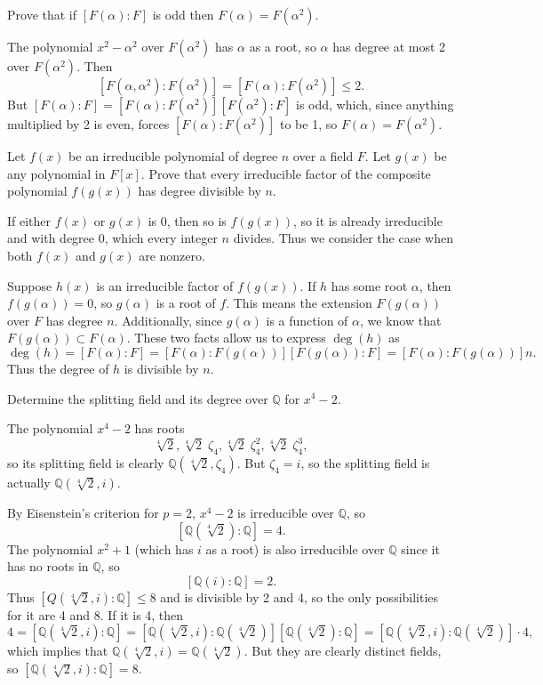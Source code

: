 \documentclass[10pt]{report}
\begin{document}
\begin{exer}[DF 13.2: 14]
	Prove that if $[F(\alpha):F]$ is odd then $F(\alpha)=F(\alpha^2)$.
\end{exer}
	The polynomial $x^2-\alpha^2$ over $F(\alpha^2)$ has $\alpha$ as a root, so $\alpha$ has degree at most 2 over $F(\alpha^2)$. Then
	\[
		[F(\alpha,\alpha^2):F(\alpha^2)] = [F(\alpha):F(\alpha^2)] \leq 2.
	\] 
	But $[F(\alpha):F]=[F(\alpha):F(\alpha^2)][F(\alpha^2):F]$ is odd, which, since anything multiplied by 2 is even, forces $[F(\alpha):F(\alpha^2)]$ to be 1, so $F(\alpha)=F(\alpha^2)$.


\begin{exer}[DF 13.2: 17]
	Let $f(x)$ be an irreducible polynomial of degree $n$ over a field $F$. Let $g(x)$ be any polynomial in $F[x]$. Prove that every irreducible factor of the composite polynomial $f(g(x))$ has degree divisible by $n$.
\end{exer}
If either $f(x)$ or $g(x)$ is 0, then so is $f(g(x))$, so it is already irreducible and with degree 0, which every integer $n$ divides. Thus we consider the case when both $f(x)$ and $g(x)$ are nonzero.

Suppose $h(x)$ is an irreducible factor of $f(g(x))$. If $h$ has some root $\alpha$, then $f(g(\alpha))=0$, so $g(\alpha)$ is a root of $f$. This means the extension $F(g(\alpha))$ over $F$ has degree $n$. Additionally, since $g(\alpha)$ is a function of $\alpha$, we know that $F(g(\alpha)) \subset F(\alpha)$. These two facts allow us to express $\deg(h)$ as
\[
	\deg(h) = [F(\alpha):F] = [F(\alpha):F(g(\alpha))][F(g(\alpha)):F] = [F(\alpha):F(g(\alpha))] n.
\] Thus the degree of $h$ is divisible by $n$.

\begin{exer}[DF 13.4: 1]
	Determine the splitting field and its degree over $\mathbb{Q}$ for $x^4-2$.
\end{exer}
The polynomial $x^4-2$ has roots
\[
	\sqrt[4]{2}, \sqrt[4]{2} \;\zeta_4, \sqrt[4]{2} \;\zeta_4^2, \sqrt[4]{2} \;\zeta_4^3,
\] so its splitting field is clearly $\mathbb{Q}(\sqrt[4]{2}, \zeta_4)$. But $\zeta_4=i$, so the splitting field is actually $\mathbb{Q}(\sqrt[4]{2}, i)$.

By Eisenstein's criterion for $p=2$, $x^4-2$ is irreducible over $\mathbb{Q}$, so \[[\mathbb{Q}(\sqrt[4]{2}):\mathbb{Q}]=4.\] The polynomial $x^2+1$ (which has $i$ as a root) is also irreducible over $\mathbb{Q}$ since it has no roots in $\mathbb{Q}$, so \[[\mathbb{Q}(i):\mathbb{Q}]=2.\] Thus $[Q(\sqrt[4]{2},i):\mathbb{Q}] \leq 8$ and is divisible by 2 and 4, so the only possibilities for it are 4 and 8. If it is 4, then
\[
	4 = [\mathbb{Q}(\sqrt[4]{2},i):\mathbb{Q}] = [\mathbb{Q}(\sqrt[4]{2},i):\mathbb{Q}(\sqrt[4]{2})][\mathbb{Q}(\sqrt[4]{2}):\mathbb{Q}] = [\mathbb{Q}(\sqrt[4]{2},i):\mathbb{Q}(\sqrt[4]{2})] \cdot 4,
\] which implies that $\mathbb{Q}(\sqrt[4]{2},i)=\mathbb{Q}(\sqrt[4]{2})$. But they are clearly distinct fields, so $[\mathbb{Q}(\sqrt[4]{2},i):\mathbb{Q}]=8$.
\end{document}

